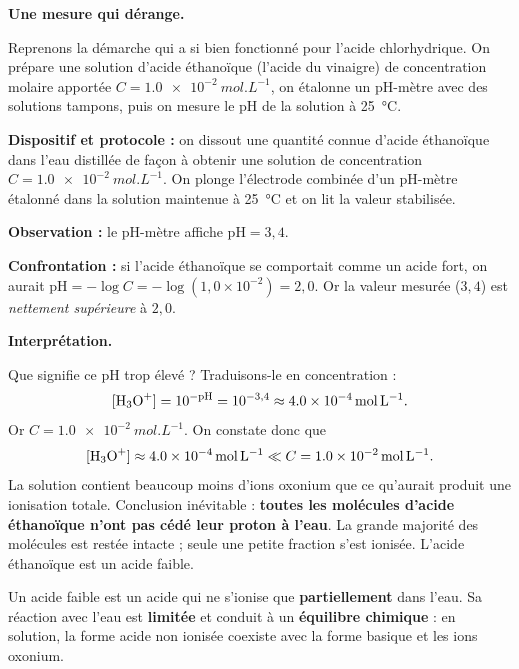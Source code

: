 \documentclass[11pt]{article}
\newcommand{\cle}[1]{{\popxbold\color{popdark}#1}}
\begin{document}
\textbf{Une mesure qui dérange.}\par

Reprenons la démarche qui a si bien fonctionné pour l'acide chlorhydrique. On prépare une solution d'\cle{acide éthanoïque}  (l'acide du vinaigre) de concentration molaire apportée $C = \SI{1,0e-2}{mol.L^{-1}}$, on étalonne un pH-mètre avec des solutions tampons, puis on mesure le pH de la solution à \SI{25}{\celsius}.

\begin{experience}
\textbf{Dispositif et protocole :} on dissout une quantité connue d'acide éthanoïque dans l'eau distillée de façon à obtenir une solution de concentration $C = \SI{1,0e-2}{mol.L^{-1}}$. On plonge l'électrode combinée d'un pH-mètre étalonné dans la solution maintenue à \SI{25}{\celsius} et on lit la valeur stabilisée.

\textbf{Observation :} le pH-mètre affiche $\mathrm{pH} = 3{,}4$.

\textbf{Confrontation :} si l'acide éthanoïque se comportait comme un acide fort, on aurait $\mathrm{pH} = -\log C = -\log(1{,}0\times 10^{-2}) = 2{,}0$. Or la valeur mesurée ($3{,}4$) est \emph{nettement supérieure} à $2{,}0$.
\end{experience}

\textbf{Interprétation.}\par

Que signifie ce pH trop élevé ? Traduisons-le en concentration :
\[
[\ce{H3O+}] = 10^{-\mathrm{pH}} = 10^{-3{,}4} \approx \SI{4,0e-4}{mol.L^{-1}}.
\]
Or $C = \SI{1,0e-2}{mol.L^{-1}}$. On constate donc que
\[
[\ce{H3O+}] \approx \SI{4,0e-4}{mol.L^{-1}} \ll C = \SI{1,0e-2}{mol.L^{-1}}.
\]
La solution contient beaucoup moins d'ions oxonium que ce qu'aurait produit une ionisation totale. Conclusion inévitable : \textbf{toutes les molécules d'acide éthanoïque n'ont pas cédé leur proton à l'eau}. La grande majorité des molécules  est restée intacte ; seule une petite fraction s'est ionisée. L'acide éthanoïque est un \cle{acide faible}.

\begin{definition}
Un \cle{acide faible} est un acide qui ne s'ionise que \textbf{partiellement} dans l'eau. Sa réaction avec l'eau est \textbf{limitée} et conduit à un \textbf{équilibre chimique} : en solution, la forme acide non ionisée coexiste avec la forme basique et les ions oxonium.
\end{definition}
\end{document}
